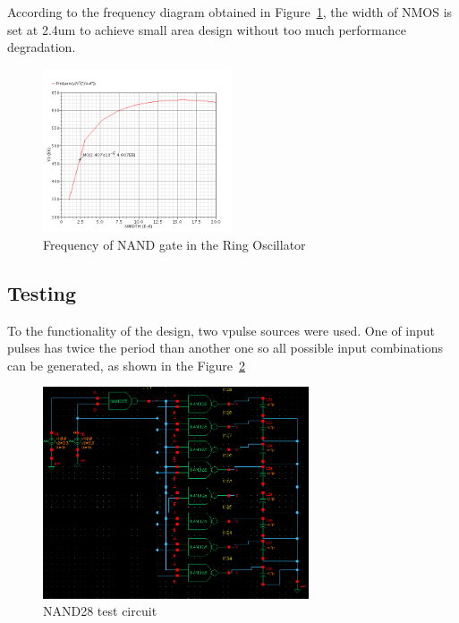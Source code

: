 According to the frequency diagram obtained in Figure~\ref{fig:nandfreq}, the width of NMOS is set at 2.4um to achieve small area design without too much performance degradation.
\begin{figure}[hf]
		\centering
		\includegraphics[width = 0.5\textwidth]{Figures/nandfreq}		
		\caption{Frequency of NAND gate in the Ring Oscillator}
		\label {fig:nandfreq}
\end{figure}

\subsection{Testing}
To the functionality of the design, two vpulse sources were used. One of input pulses has twice the period than another one so all possible input combinations can be generated, as shown in the Figure~\ref{fig:nandtest1}
   
\begin{figure}[hf]
		\centering
		\includegraphics[width = 0.7\textwidth]{Figures/nandtest1}		
		\caption{NAND28 test circuit}
		\label {fig:nandtest1}
\end{figure}


